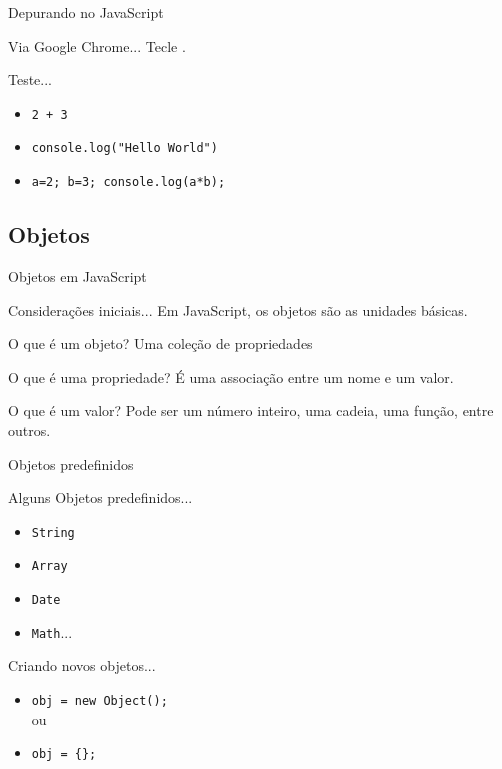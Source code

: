 \documentclass[xcolor=dvipsnames,table]{beamer}
\begin{document}
\begin{frame}{Depurando no JavaScript}
	\begin{block}{Via Google Chrome...}
		Tecle .
	\end{block} \pause
	\begin{block}{Teste...}
		\begin{itemize}
			\item {\tt 2 + 3}
			\item {\tt console.log("Hello World")}
			\item {\tt a=2; b=3; console.log(a*b);}
		\end{itemize}
	\end{block}
\end{frame}

\subsection{Objetos}
\begin{frame}{Objetos em JavaScript}
	\begin{block}{Considerações iniciais...}
		Em JavaScript, os objetos são as unidades básicas.
	\end{block} \pause
	\begin{block}{O que é um objeto?}
		Uma coleção de propriedades	
	\end{block} \pause
	\begin{block}{O que é uma propriedade?}
		É uma associação entre um nome e um valor.
	\end{block} \pause
	\begin{block}{O que é um valor?}
		Pode ser um número inteiro, uma cadeia, uma função, entre outros.
	\end{block}
\end{frame}

\begin{frame}{Objetos predefinidos}
	\begin{block}{Alguns Objetos predefinidos...}
		\begin{itemize}
			\item {\tt String}
			\item {\tt Array}
			\item {\tt Date}
			\item {\tt Math}...
		\end{itemize}
	\end{block} \pause
	\begin{block}{Criando novos objetos...}
		\begin{itemize}
			\item {\tt obj = new Object();}
			\\ou
			\item {\tt obj = \{\};}
		\end{itemize}
	\end{block}
\end{frame}
\end{document}
